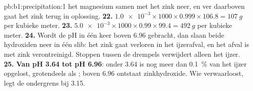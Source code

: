 \begin{solution}{pb:b1:precipitation:1}
het magnesium samen met het zink neer, en ver daarboven gaat het zink
terug in oplossing.
\textbf{22.} $\num{1.0e-3} \times 1000 \times 0.999 \times 106.8 =
\qty{107}{g}$ per kubieke meter.
\textbf{23.} $\num{5.0e-3} \times 1000 \times 0.99 \times 99.4 =
\qty{492}{g}$ per kubieke meter.
\textbf{24.} Wordt de pH in één keer boven 6.96 gebracht, dan slaan beide
hydroxiden neer in één slib: het zink gaat verloren in het ijzerafval,
en het afval is met zink verontreinigd. Stoppen tussen de drempels
verwijdert alleen het ijzer.
\textbf{25.} \textbf{Van pH 3.64 tot pH 6.96}: onder 3.64 is nog meer dan
\qty{0.1}{\percent} van het ijzer opgelost, grotendeels als ;
boven 6.96 ontstaat zinkhydroxide. Wie  verwaarloost, legt
de ondergrens bij 3.15.
\end{solution}
